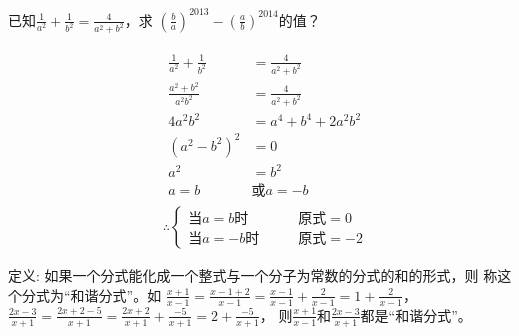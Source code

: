 \documentclass[answers]{exam} %
\newcommand\epart{\part}
\begin{document}
\begin{questions}
\question
  已知$\frac{1}{a^2} + \frac{1}{b^2} = \frac{4}{a^2 + b^2}$，求
  $(\frac{b}{a})^{2013} - (\frac{a}{b})^{2014}$的值？

  \vspace*{1in}
  \begin{solution}
    \[
      \begin{aligned}
        & \begin{aligned}
          \frac{1}{a^2} + \frac{1}{b^2} &= \frac{4}{a^2 + b^2} \\
          \frac{a^2 + b^2}{a^2 b^2} &= \frac{4}{a^2 + b^2} \\
          4 a^2 b^2 &= a^4 + b^4 + 2 a^2 b^2 \\
          (a^2 - b^2)^2 &= 0 \\
          a^2 &= b^2 \\
          a = b & \mbox{或} a = -b
        \end{aligned} \\
        & \therefore \begin{cases}
          \mbox{当} a = b \mbox{时} \qquad &\mbox{原式} = 0 \\
          \mbox{当} a = -b \mbox{时} \qquad &\mbox{原式} = -2
        \end{cases}
      \end{aligned}
    \]
  \end{solution}

\question
  定义: 如果一个分式能化成一个整式与一个分子为常数的分式的和的形式，则
  称这个分式为“和谐分式”。如
  $\frac{x+1}{x-1}
  =\frac{x - 1 + 2}{x - 1}
  =\frac{x - 1}{x - 1} + \frac{2}{x - 1}
  =1 + \frac{2}{x - 1}$，
  $\frac{2x- 3}{x + 1}
  = \frac{2x + 2 - 5}{x + 1}
  = \frac{2x + 2}{x + 1} + \frac{-5}{x + 1}
  = 2 + \frac{-5}{x + 1}$，
  则$\frac{x+1}{x-1}$和$\frac{2x-3}{x+1}$都是“和谐分式”。

\end{questions}
\end{document}

